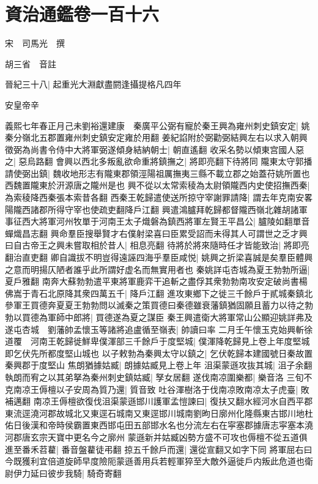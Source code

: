 \section{資治通鑑卷一百十六}


宋　司馬光　撰

胡三省　音註

晉紀三十八|{
	起重光大淵獻盡閼逢攝提格凡四年}


安皇帝辛

義熙七年春正月己未劉裕還建康　秦廣平公弼有寵於秦王興為雍州刺史鎮安定|{
	姚秦分嶺北五郡置雍州刺史鎮安定雍於用翻}
姜紀諂附於弼勸弼結興左右以求入朝興徵弼為尚書令侍中大將軍弼遂傾身結納朝士|{
	朝直遙翻}
收采名勢以傾東宫國人惡之|{
	惡烏路翻}
會興以西北多叛亂欲命重將鎮撫之|{
	將即亮翻下待將同}
隴東太守郭播請使弼出鎮|{
	魏收地形志有隴東郡領涇陽祖厲撫夷三縣不載立郡之始蓋苻姚所置也西魏置隴東於汧源唐之隴州是也}
興不從以太常索稜為太尉領隴西内史使招撫西秦|{
	為索稜降西秦張本索昔各翻}
西秦王乾歸遣使送所掠守宰謝罪請降|{
	謂去年克南安畧陽隴西諸郡所得守宰也使疏吏翻降戶江翻}
興遣鴻臚拜乾歸都督隴西嶺北雜胡諸軍事征西大將軍河州牧單于河南王太子熾磐為鎮西將軍左賢王平昌公|{
	臚陵如翻單音蟬熾昌志翻}
興命羣臣搜舉賢才右僕射梁喜曰臣累受詔而未得其人可謂世之乏才興曰自古帝王之興未嘗取相於昔人|{
	相息亮翻}
待將於將來隨時任才皆能致治|{
	將即亮翻治直吏翻}
卿自識拔不明豈得遠誣四海乎羣臣咸悦|{
	姚興之折梁喜誠是矣羣臣體興之意而明揚仄陋者誰乎此所謂好虚名而無實用者也}
秦姚詳屯杏城為夏王勃勃所逼|{
	夏戶雅翻}
南奔大蘇勃勃遣平東將軍鹿弈干追斬之盡俘其衆勃勃南攻安定破尚書楊佛嵩于青石北原降其衆四萬五千|{
	降戶江翻}
進攻東鄉下之徙三千餘戶于貳城秦鎮北參軍王買德奔夏夏王勃勃問以滅秦之策買德曰秦德雖衰藩鎮猶固願且蓄力以待之勃勃以買德為軍師中郎將|{
	買德遂為夏之謀臣}
秦王興遣衛大將軍常山公顯迎姚詳弗及遂屯杏城　劉藩帥孟懷玉等諸將追盧循至嶺表|{
	帥讀曰率}
二月壬午懷玉克始興斬徐道覆　河南王乾歸徙鮮卑僕渾部三千餘戶于度堅城|{
	僕渾降乾歸見上卷上年度堅城即乞伏先所都度堅山城也}
以子敕勃為秦興太守以鎮之|{
	乞伏乾歸本建國號日秦故置秦興郡于度堅山}
焦朗猶據姑臧|{
	朗據姑臧見上卷上年}
沮渠蒙遜攻抜其城|{
	沮子余翻}
執朗而宥之以其弟拏為秦州刺史鎮姑臧|{
	孥女居翻}
遂伐南凉圍樂都|{
	樂音洛}
三旬不克南凉王傉檀以子安周為質乃還|{
	質音致}
吐谷渾樹洛于伐南凉敗南凉太子虎臺|{
	敗補邁翻}
南凉王傉檀欲復伐沮渠蒙遜邯川護軍孟愷諫曰|{
	復扶又翻水經河水自西平郡東流逕澆河郡故城北又東逕石城南又東逕邯川城南劉昫日廓州化隆縣東古邯川地杜佑日後漢和帝時侯霸置東西邯屯田五部邯水名也分流左右在寜塞郡據唐志寜塞本澆河郡唐玄宗天寶中更名今之廓州}
蒙遜新并姑臧凶勢方盛不可攻也傉檀不從五道俱進至番禾苕藋|{
	番音盤藋徒弔翻}
掠五千餘戶而還|{
	還從宣翻又如字下同}
將軍屈右曰今既獲利宜倍道旋師早度險阨蒙遜善用兵若輕軍猝至大敵外逼徙戶内叛此危道也衛尉伊力延曰彼步我騎|{
	騎奇寄翻}
